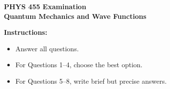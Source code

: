 \documentclass[11pt]{article}
\begin{document}
\begin{center}
  {\Large \textbf{PHYS 455 Examination}}\\[0.25em]
  {\large \textbf{Quantum Mechanics and Wave Functions}}\\[0.5em]
\end{center}

\noindent\textbf{Instructions:}
\begin{itemize}
  \item Answer all questions.
  \item For Questions 1--4, choose the best option.
  \item For Questions 5--8, write brief but precise answers.
\end{itemize}

\vspace{0.5em}
\end{document}
